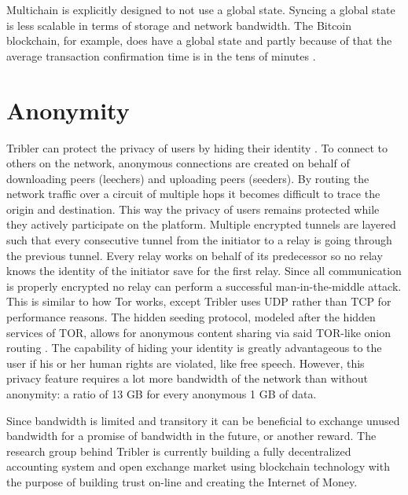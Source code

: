 Multichain is explicitly designed to not use a global state.
Syncing a global state is less scalable in terms of storage and network bandwidth.
The Bitcoin blockchain, for example, does have a global state and partly because of that the average transaction confirmation time is in the tens of minutes \cite{bitcoin_avg-confirmation-time}.


\section{Anonymity}
Tribler can protect the privacy of users by hiding their identity \cite{anon_internet, tribler-anon-hd, anon_HD_streaming}.
To connect to others on the network, anonymous connections are created on behalf of downloading peers (leechers) and uploading peers (seeders).
By routing the network traffic over a circuit of multiple hops it becomes difficult to trace the origin and destination.
This way the privacy of users remains protected while they actively participate on the platform.
Multiple encrypted tunnels are layered such that every consecutive tunnel from the initiator to a relay is going through the previous tunnel.
Every relay works on behalf of its predecessor so no relay knows the identity of the initiator save for the first relay.
Since all communication is properly encrypted no relay can perform a successful man-in-the-middle attack.
This is similar to how Tor works, except Tribler uses UDP rather than TCP for performance reasons.
The hidden seeding protocol, modeled after the hidden services of TOR, allows for anonymous content sharing via said TOR-like onion routing \cite{tor_bittorrent}.
The capability of hiding your identity is greatly advantageous to the user if his or her human rights are violated, like free speech.
However, this privacy feature requires a lot more bandwidth of the network than without anonymity: a ratio of 13 GB for every anonymous 1 GB of data.

Since bandwidth is limited and transitory it can be beneficial to exchange unused bandwidth for a promise of bandwidth in the future, or another reward.
The research group behind Tribler is currently building a fully decentralized accounting system and open exchange market using blockchain technology with the purpose of building trust on-line and creating the Internet of Money.


